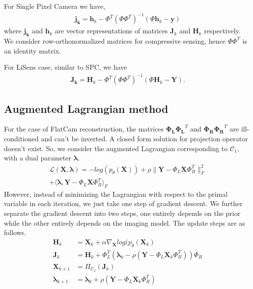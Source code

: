 \documentclass[journal,twoside]{IEEEtran}
\newcommand{\X}{\mathbf{X}}
\newcommand{\Y}{\mathbf{Y}}
\begin{document}
For Single Pixel Camera we have,
\begin{align}
\label{eq:proj_spc}
\mathbf{j_k} = \mathbf{h}_k-\Phi^T\left(\Phi\Phi^T\right)^{-1}\left(\Phi\mathbf{h}_k-\mathbf{y}\right)
\end{align}
where $\mathbf{j_k}$ and $\mathbf{h}_k$ are vector representations of matrices $\mathbf{J}_k$ and $\mathbf{H}_k$ respectively. We consider row-orthonormalized matrices for compressive sensing, hence $\Phi\Phi^T$ is an identity matrix.

For LiSens case, similar to SPC, we have 
\begin{align}
\label{eq:proj_lisens}
    \mathbf{J_k} = \mathbf{H}_k-\Phi^T\left(\Phi\Phi^T\right)^{-1}\left(\Phi\mathbf{H}_k-\Y\right).
\end{align}

\subsection{Augmented Lagrangian method}
\label{sec:augmented_lag}
For the case of FlatCam reconstruction, the matrices $\mathbf{\Phi_L}\mathbf{\Phi_L}^T$ and $\mathbf{\Phi_R}\mathbf{\Phi_R}^T$ are ill-conditioned and can't be inverted. A closed form solution for projection operator doesn't exist. So, we consider the augmented Lagrangian corresponding to $\mathcal{C}_1$, with a dual parameter $\mathbf{\lambda}$.
\begin{multline}
\mathcal{L}(\X,\bm{\lambda}) = -log(p_{\theta}(\X)) + \rho\|\Y - \Phi_L \X \Phi_R^T \|^2_F \\ + \langle \bm{\lambda}, \Y - \Phi_L \X \Phi_R^T  \rangle_F
\end{multline}
However, instead of minimizing the Lagrangian with respect to the primal variable in each iteration, we just take one step of gradient descent. We further separate the gradient descent into two steps, one entirely depends on the prior while the other entirely depends on the imaging model. The update steps are as follows.
\begin{align}
    \mathbf{H}_k &= \X_k + \alpha \nabla_{\X}{log(p_{\theta}(\X_k)} \\
    \label{eq:proj_flatcam}
    \mathbf{J}_k &= \mathbf{H}_k + \Phi_L^T (\bm{\lambda}_k -  \rho(\Y - \Phi_L \X_k \Phi_R^T)) \Phi_R \\
    \X_{k+1} &= \Pi_{\mathcal{C}_2}(\mathbf{J}_{k}) \\
    \label{eq:dual_v}
    \bm{\lambda}_{k+1} &= \bm{\lambda}_k + \rho(\Y - \Phi_L \X_k \Phi_R^T )
\end{align}
\end{document}
